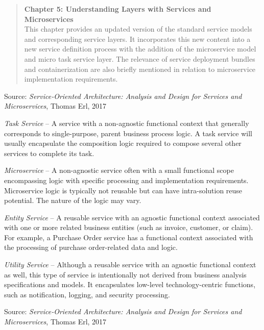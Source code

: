 \documentclass[Screen16to9,17pt]{foils}
\begin{document}

\begin{quote}
{\bf Chapter 5: Understanding Layers with Services and Microservices}\\
This chapter provides an updated version of the standard service models and corresponding service layers. It incorporates this new content into a new service definition process with the addition of the microservice model and micro task service layer. The relevance of service deployment bundles and containerization are also briefly mentioned in relation to microservice implementation requirements.
\end{quote}
Source: \emph{Service‑Oriented Architecture: Analysis and Design for Services and Microservices}, Thomas Erl, 2017




\begin{list2}
\item \emph{Task Service} -- A service with a non-agnostic functional context that generally corresponds to single-purpose, parent business process logic. A task service will usually encapsulate the composition logic required to compose several other services to complete its task.
\item \emph{Microservice} -- A non-agnostic service often with a small functional scope encompassing logic with specific processing and implementation requirements. Microservice logic is typically not reusable but can have intra-solution reuse potential. The nature of the logic may vary.
\item \emph{Entity Service} -- A reusable service with an agnostic functional context associated with one or more related business entities (such as invoice, customer, or claim). For example, a Purchase Order service has a functional context associated with the processing of purchase order-related data and logic.
\item \emph{Utility Service} -- Although a reusable service with an agnostic functional context as well, this type of service is intentionally not derived from business analysis specifications and models. It encapsulates low-level technology-centric functions, such as notification, logging, and security processing.
\end{list2}

Source: \emph{Service‑Oriented Architecture: Analysis and Design for Services and Microservices}, Thomas Erl, 2017
\end{document}
